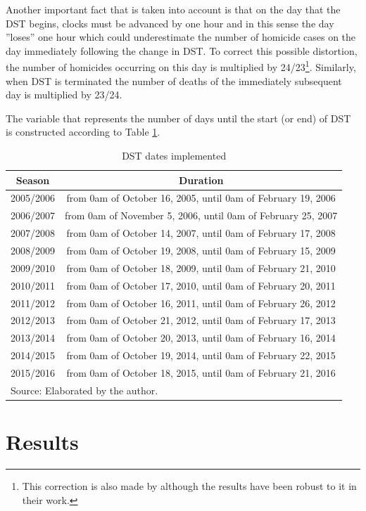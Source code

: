 \documentclass[12pt,openright,oneside,a4paper,english,french,spanish]{abntex2}
\numberwithin{table}{section} %
\numberwithin{figure}{section} %
\newcommand{\co}{\citeonline}
\begin{document}
\begin{otherlanguage}{english}
Another important fact that is taken into account is that on the day that the DST begins, clocks must be advanced by one hour and in this sense the day ''loses'' one hour which could underestimate the number of homicide cases on the day immediately following the change in DST. To correct this possible distortion, the number of homicides occurring on this day is multiplied by 24/23\footnote{This correction is also made by \co{toro2016} although the results have been robust to it in their work.}. Similarly, when DST is terminated the number of deaths of the immediately subsequent day is multiplied by 23/24.

The variable that represents the number of days until the start (or end) of DST is constructed according to Table \ref{tab:HV_RS}.


\begin{table}[H]
\caption{DST dates implemented}
\begin{center}
\begin{small}
\begin{tabular}{cc}
\hline 
Season & Duration\\
\hline 
2005/2006 & from 0am of October 16, 2005, until 0am of February 19, 2006\tabularnewline
2006/2007 & from 0am of November 5, 2006, until 0am of February 25, 2007\tabularnewline
2007/2008 & from 0am of October 14, 2007, until 0am of February 17, 2008\tabularnewline
2008/2009 & from 0am of October 19, 2008, until 0am of February 15, 2009\tabularnewline
2009/2010 & from 0am of October 18, 2009, until 0am of February 21, 2010\tabularnewline
2010/2011 & from 0am of October 17, 2010, until 0am of February 20, 2011\tabularnewline
2011/2012 & from 0am of October 16, 2011, until 0am of February 26, 2012\tabularnewline
2012/2013 & from 0am of October 21, 2012, until 0am of February 17, 2013\tabularnewline
2013/2014 & from 0am of October 20, 2013, until 0am of February 16, 2014\tabularnewline
2014/2015 & from 0am of October 19, 2014, until 0am of February 22, 2015\tabularnewline
2015/2016 & from 0am of October 18, 2015, until 0am of February 21, 2016\tabularnewline
\hline
\multicolumn{2}{l}{Source: Elaborated by the author.}
\end{tabular}
\end{small}
\end{center}
\label{tab:HV_RS}
\end{table}


\section{Results\label{resultados_HV}}




\end{otherlanguage}
\end{document}
